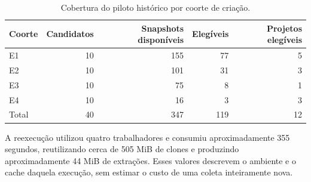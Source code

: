 \begin{table}[htbp]
\centering
\caption{Cobertura do piloto histórico por coorte de criação.}
\label{tab:piloto-historico-cobertura}
\small
\begin{tabular}{lrrrr}
\hline
Coorte & Candidatos & Snapshots disponíveis & Elegíveis & Projetos elegíveis \\
\hline
E1 & 10 & 155 & 77 & 5 \\
E2 & 10 & 101 & 31 & 3 \\
E3 & 10 & 75 & 8 & 1 \\
E4 & 10 & 16 & 3 & 3 \\
\hline
Total & 40 & 347 & 119 & 12 \\
\hline
\end{tabular}
\end{table}

A reexecução utilizou quatro trabalhadores e consumiu aproximadamente 355 segundos, reutilizando cerca de 505 MiB de clones e produzindo aproximadamente 44 MiB de extrações. Esses valores descrevem o ambiente e o cache daquela execução, sem estimar o custo de uma coleta inteiramente nova.
